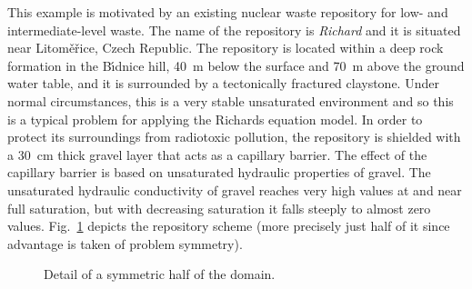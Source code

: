 \documentclass[final,3p,times,twocolumn]{elsarticle}
\begin{document}
This example is motivated by an existing nuclear waste repository for 
low- and intermediate-level waste. The name of the repository is {\em Richard} and it is situated %
near Litom\v e\v rice, Czech Republic. The repository is located within a deep 
rock formation in the B{\'\i}dnice hill, 40~m below the surface and 70~m above 
the ground water table, and it is  surrounded by a tectonically fractured 
claystone. Under normal circumstances, this is a very stable unsaturated environment 
and so this is a typical problem for applying the Richards equation model. 
In order to protect its surroundings from radiotoxic pollution, the repository is shielded 
with a 30~cm thick gravel layer that acts as a capillary barrier.  
The effect of the capillary barrier is based on unsaturated hydraulic properties of gravel.
The unsaturated hydraulic conductivity of gravel reaches very high values 
at and near full saturation, but with decreasing saturation it falls steeply 
to almost zero values. Fig.~\ref{fig:cap-barrier-domain} depicts the repository 
scheme (more precisely just half of it since advantage is taken of
problem symmetry).

\begin{figure}[htb!]
    \begin{center} 
    \end{center}
        \caption{Detail of a symmetric half of the domain.}
      \label{fig:cap-barrier-domain}
\end{figure}
\end{document}
